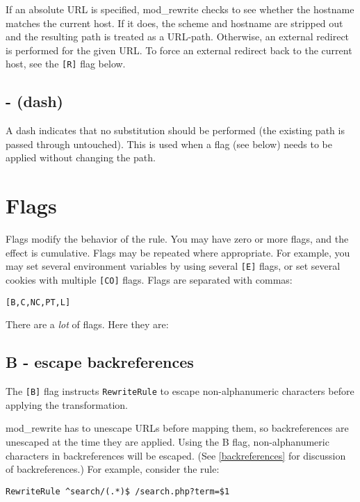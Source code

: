If an absolute URL is specified, mod\_rewrite checks to see whether the hostname matches the current host. If it does, the scheme and hostname are stripped out and the resulting path is treated as a URL-path. Otherwise, an external redirect is performed for the given URL. To force an external redirect back to the current host, see the \verb~[R]~ flag below.

\subsection{- (dash)}

A dash indicates that no substitution should be performed (the existing path is passed through untouched). This is used when a flag (see below) needs to be applied without changing the path.

\section{Flags}
\label{flags}

Flags modify the behavior of the rule. You may have zero or more flags, and the effect is cumulative. Flags may be repeated where appropriate. For example, you may set several environment variables by using several \verb~[E]~ flags, or set several cookies with multiple \verb~[CO]~ flags. Flags are separated with commas:

\begin{verbatim}
[B,C,NC,PT,L]
\end{verbatim}

There are a \emph{lot} of flags. Here they are:

\subsection{B - escape backreferences}
\label{bflag}

The \verb~[B]~ flag instructs \verb~RewriteRule~ to escape non-alphanumeric characters before applying the transformation.

mod\_rewrite has to unescape URLs before mapping them, so backreferences are unescaped at the time they are applied. Using the B flag, non-alphanumeric characters in backreferences will be escaped. (See \ref{backreferences} for discussion of backreferences.) For example, consider the rule:

\begin{verbatim}
RewriteRule ^search/(.*)$ /search.php?term=$1
\end{verbatim}

